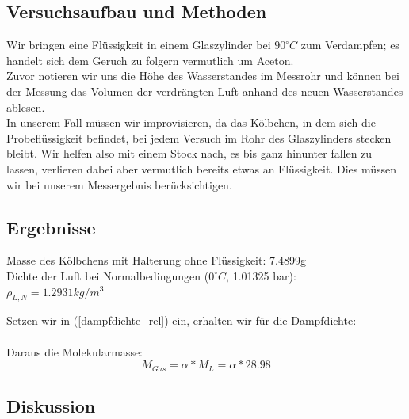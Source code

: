 \documentclass{article}
\begin{document}
\subsection{Versuchsaufbau und Methoden}
Wir bringen eine Flüssigkeit in einem Glaszylinder bei $90^\circ C$ zum Verdampfen; es handelt sich dem Geruch zu folgern vermutlich um Aceton. \\
Zuvor notieren wir uns die Höhe des Wasserstandes im Messrohr und können bei der Messung das Volumen der verdrängten Luft anhand des neuen Wasserstandes ablesen.\\
In unserem Fall müssen wir  improvisieren, da das Kölbchen, in dem sich die Probeflüssigkeit befindet, bei jedem Versuch im Rohr des Glaszylinders stecken bleibt. Wir helfen also mit einem Stock nach, es bis ganz hinunter fallen zu lassen, verlieren dabei aber vermutlich bereits etwas an Flüssigkeit. Dies müssen wir bei unserem Messergebnis berücksichtigen.
\subsection{Ergebnisse}

Masse des Kölbchens mit Halterung ohne Flüssigkeit: 7.4899g\\
Dichte der Luft bei Normalbedingungen ($0^\circ C$, 1.01325 bar):\\
$\rho_{L,N}=1.2931kg/m^3$

Setzen wir in (\ref{dampfdichte_rel}) ein, erhalten wir für die Dampfdichte:\\
\\
Daraus die Molekularmasse:\\
$$M_{Gas}=\alpha*M_L=\alpha*28.98$$

\subsection{Diskussion}
\end{document}
